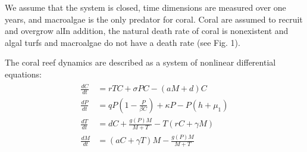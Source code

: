 \documentclass[12pt]{article}
\begin{document}
We assume that the system is closed, time dimensions are measured over one years, and macroalgae is the only predator for coral. Coral are assumed to recruit and overgrow alIn addition, the natural death rate of coral is nonexistent and algal turfs and macroalgae do not have a death rate (see Fig. 1).




The coral reef dynamics are described as a system of nonlinear differential equations: 
\begin{align}
    \begin{split}
        \frac{dC}{dt} &= rTC + \sigma P C- (aM+d)C\\
        \frac{dP}{dt} &= qP \left( 1-\frac{P}{\beta C} \right) + \kappa P - P \left( h+\mu_{1} \right)\\
        \frac{dT}{dt} &= dC + \frac{g(P)M}{M+T} - T(rC+\gamma M)\\
        \frac{dM}{dt} &= (aC+ \gamma T)M - \frac{g(P)M}{M+T}
    \end{split}
\end{align}
\end{document}
